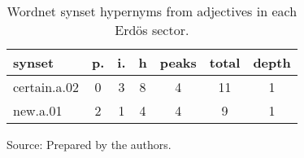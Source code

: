 \begin{table}[h!]
\begin{center}
\caption{Wordnet synset hypernyms from adjectives in each Erd\"os sector.}
	\label{tab:wnash}
\begin{tabular}{| l || c | c | c || c | c | c |}\hline
{\bf synset} & {\bf p.} & {\bf i.} & {\bf h} & {\bf peaks} & {\bf total} & {\bf depth} \\\hline\hline
certain.a.02 & 0  & 3  & 8  & 4  & 11  & 1 \\
new.a.01 & 2  & 1  & 4  & 4  & 9  & 1 \\\hline
\end{tabular}
\begin{flushleft}
		Source: Prepared by the authors.\
\end{flushleft}
\end{center}
\end{table}
